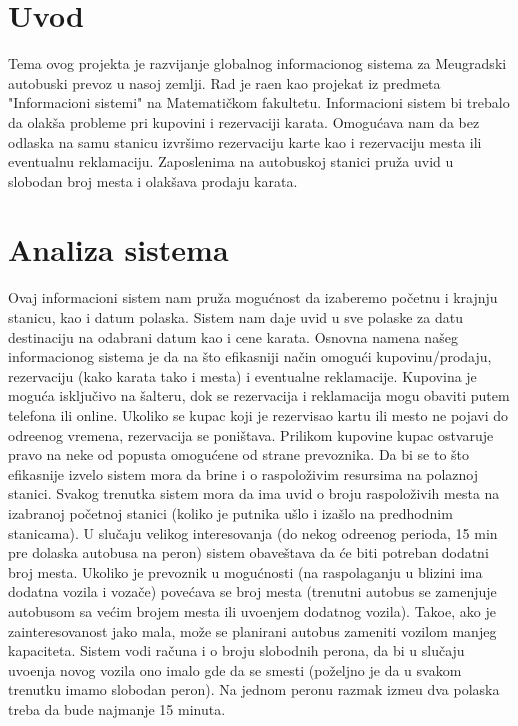 \section{Uvod}

Tema ovog projekta je razvijanje globalnog informacionog sistema za Me\dj{}ugradski autobuski prevoz u nasoj zemlji. Rad je ra\dj{}en kao projekat iz predmeta "Informacioni sistemi" na Matemati\v ckom fakultetu. Informacioni sistem bi trebalo da olak\v sa probleme pri kupovini i rezervaciji karata. Omogu\'cava nam da bez odlaska na samu stanicu izvr\v simo rezervaciju karte kao i rezervaciju mesta ili eventualnu reklamaciju. Zaposlenima na autobuskoj stanici pru\v za uvid u slobodan broj mesta i olak\v sava prodaju karata.
\section {Analiza sistema}

Ovaj informacioni sistem nam pru\v za mogu\'cnost da izaberemo po\v cetnu i krajnju stanicu, kao i datum polaska. Sistem nam daje uvid u sve polaske za datu destinaciju na odabrani datum kao i cene karata. 
Osnovna namena na\v seg informacionog sistema je da na \v sto efikasniji na\v cin omogu\'ci kupovinu/prodaju, rezervaciju (kako karata tako i mesta) i eventualne reklamacije. Kupovina je mogu\'ca isklju\v civo na \v salteru, dok se rezervacija i reklamacija mogu obaviti putem telefona ili online. Ukoliko se kupac koji je rezervisao kartu ili mesto ne pojavi do odre\dj{}enog vremena, rezervacija se poni\v stava. Prilikom kupovine kupac ostvaruje pravo na neke od popusta omogu\'cene od strane prevoznika. Da bi se to \v sto efikasnije izvelo sistem mora da brine i o raspolo\v zivim resursima na polaznoj stanici. Svakog trenutka sistem mora da ima uvid o broju raspolo\v zivih mesta na izabranoj po\v cetnoj stanici (koliko je putnika u\v slo i iza\v slo na predhodnim stanicama). U slu\v caju velikog interesovanja (do nekog odre\dj{}enog perioda, 15 min pre dolaska autobusa na peron) sistem obave\v stava da \'ce biti potreban dodatni broj mesta. Ukoliko je prevoznik u mogu\'cnosti (na raspolaganju u blizini ima dodatna vozila i voza\v ce) pove\'cava se broj mesta (trenutni autobus se zamenjuje autobusom sa ve\'cim brojem mesta ili uvo\dj{}enjem dodatnog vozila). Tako\dj{}e, ako je zainteresovanost jako mala, mo\v ze se planirani autobus zameniti vozilom manjeg kapaciteta. Sistem vodi ra\v cuna i o broju slobodnih perona, da bi u slu\v caju uvo\dj{}enja novog vozila ono imalo gde da se smesti (po\v zeljno je da u svakom trenutku imamo slobodan peron). Na jednom peronu razmak izme\dj{}u dva polaska treba da bude najmanje 15 minuta.

